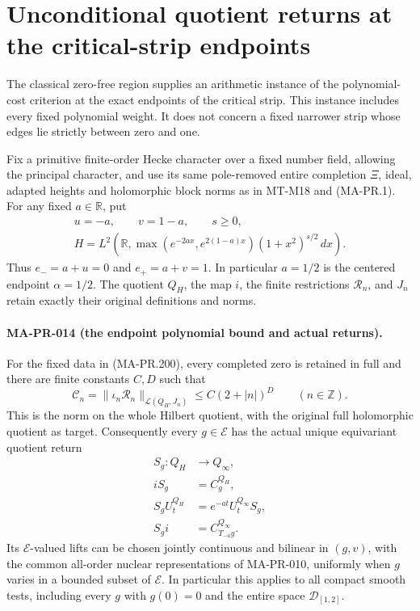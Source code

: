 \section{Unconditional quotient returns at the critical-strip endpoints}
\label{sec:endpoint-quotient-return}

The classical zero-free region supplies an arithmetic instance
of the polynomial-cost criterion at the exact endpoints of
the critical strip.  This instance includes every fixed
polynomial weight.  It does not concern a fixed narrower
strip whose edges lie strictly between zero and one.

Fix a primitive finite-order Hecke character over a fixed
number field, allowing the principal character, and use its
same pole-removed entire completion \(\Xi\), ideal,
adapted heights and holomorphic block norms as in
MT-M18 and (MA-PR.1).  For any fixed \(a\in\mathbb R\),
put
\[
 \begin{gathered}
 u=-a,\qquad v=1-a,\qquad s\ge0,\\
 H=L^2\!\left(\mathbb R,
       \max(e^{-2ax},e^{2(1-a)x})(1+x^2)^{s/2}\,dx\right).
 \end{gathered}
 \tag{MA-PR.200}
\]
Thus \(e_-=a+u=0\) and \(e_+=a+v=1\).
In particular \(a=1/2\) is the centered endpoint
\(\alpha=1/2\).  The quotient \(Q_H\), the map \(i\),
the finite restrictions \(\mathscr R_n\), and \(J_n\)
retain exactly their original definitions and norms.

\paragraph{MA-PR-014 (the endpoint polynomial bound and actual returns).}
For the fixed data in (MA-PR.200), every completed zero
is retained in full and there are finite constants
\(C,D\) such that
\[
       \mathcal C_n
        =\|\iota_n\mathscr R_n\|_{\mathcal L(Q_H,J_n)}
                    \le C(2+|n|)^D
                         \qquad(n\in\mathbb Z).
 \tag{MA-PR.201}
\]
This is the norm on the whole Hilbert quotient, with
the original full holomorphic quotient as target.
Consequently every \(g\in\mathcal E\) has the actual
unique equivariant quotient return
\[
 \begin{aligned}
 S_g:Q_H&\longrightarrow Q_\infty,\\
 iS_g&=C_g^{Q_H},\\
 S_gU_t^{Q_H}&=e^{-at}U_t^{Q_\infty}S_g,\\
 S_gi&=C_{T_{-a}g}^{Q_\infty}.
 \end{aligned}
 \tag{MA-PR.202}
\]
Its \(\mathcal E\)-valued lifts can be chosen jointly
continuous and bilinear in \((g,v)\), with the common
all-order nuclear representations of MA-PR-010,
uniformly when \(g\) varies in a bounded subset of
\(\mathcal E\).
In particular this applies to all compact smooth
tests, including every \(g\) with \(g(0)=0\) and the
entire space \(\mathcal D_{[1,2]}\).

